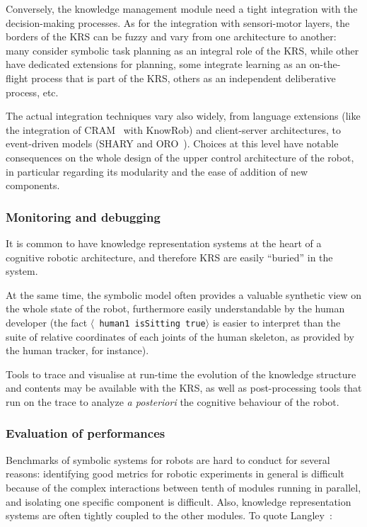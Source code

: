 \documentclass[a4paper, twocolumn]{article}
\newcommand{\stmt}[1]{{\footnotesize \tt $\langle$ #1\relax$\rangle$}}
\begin{document}
Conversely, the knowledge management module need a tight integration with the
decision-making processes. As for the integration with sensori-motor
layers, the borders of the KRS can be fuzzy and vary from one architecture to
another: many consider symbolic task planning as an integral role of the KRS,
while other have dedicated extensions for planning, some integrate learning as
an on-the-flight process that is part of the KRS, others as an independent
deliberative process, etc.

The actual integration techniques vary also widely, from language extensions
(like the integration of CRAM~\cite{Beetz2010} with KnowRob) and client-server
architectures, to event-driven models (SHARY and ORO~\cite{Alami2011}). Choices
at this level have notable consequences on the whole design of the upper
control architecture of the robot, in particular regarding its modularity and
the ease of addition of new components.

\subsubsection{Monitoring and debugging}
\label{sect|debugging}

It is common to have knowledge representation systems at the heart of a
cognitive robotic architecture, and therefore KRS are easily ``buried'' in the
system.

At the same time, the symbolic model often provides a valuable synthetic view
on the whole state of the robot, furthermore easily understandable by the human
developer (the fact \stmt{human1 isSitting true} is easier to interpret than
the suite of relative coordinates of each joints of the human skeleton, as
provided by the human tracker, for instance).

Tools to trace and visualise at run-time the evolution of the knowledge
structure and contents may be available with the KRS, as well as
post-processing tools that run on the trace to analyze {\it a posteriori} the
cognitive behaviour of the robot.

\subsubsection{Evaluation of performances}
\label{sect|performances}

Benchmarks of symbolic systems for robots are hard to conduct for several
reasons: identifying good metrics for robotic experiments in general is
difficult because of the complex interactions between tenth of modules running
in parallel, and isolating one specific component is difficult.  Also,
knowledge representation systems are often tightly coupled to the other
modules. To quote Langley~\cite{Langley2006}:
\end{document}
